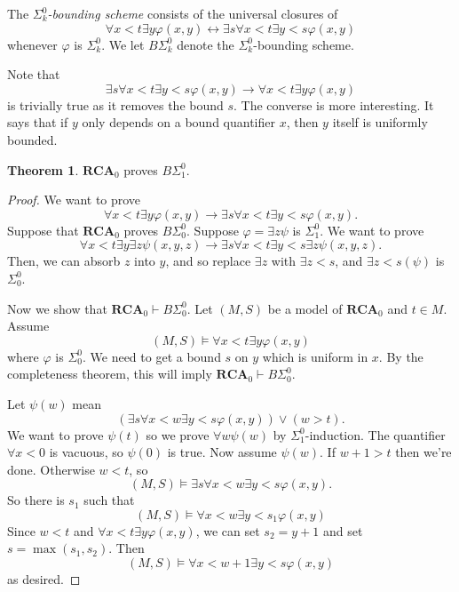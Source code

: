 \documentclass[12pt]{book}
\newcommand{\RCA}{\mathbf{RCA}}
\newcommand{\dfn}[1]{\emph{#1}\index{#1}}
\theoremstyle{definition}
\newtheorem{theorem}{Theorem}[chapter]
\newenvironment{definition}
  {\pushQED{\qed}\renewcommand{\qedsymbol}{$\diamondsuit$}\definitionx}
  {\popQED\endexamplex}
\begin{document}
\begin{definition}
The \dfn{$\Sigma_k^0$-bounding scheme} consists of the universal closures of
$$\forall x < t \exists y \varphi(x, y) \leftrightarrow \exists s \forall x < t \exists y < s \varphi(x, y)$$
whenever $\varphi$ is $\Sigma_k^0$. We let $B\Sigma_k^0$ denote the $\Sigma_k^0$-bounding scheme.
\end{definition}

Note that
$$\exists s \forall x < t \exists y < s \varphi(x, y) \to \forall x < t \exists y \varphi(x, y)$$
is trivially true as it removes the bound $s$. The converse is more interesting.
It says that if $y$ only depends on a bound quantifier $x$, then $y$ itself is uniformly bounded.

\begin{theorem}
$\RCA_0$ proves $B\Sigma_1^0$.
\end{theorem}
\begin{proof}
We want to prove
$$\forall x < t \exists y \varphi(x, y) \to \exists s \forall x < t \exists y < s \varphi(x, y).$$
Suppose that $\RCA_0$ proves $B\Sigma_0^0$.
Suppose $\varphi = \exists z \psi$ is $\Sigma_1^0$.
We want to prove
$$\forall x < t \exists y \exists z \psi(x, y, z) \to \exists s \forall x < t \exists y < s \exists z \psi(x, y, z).$$
Then, we can absorb $z$ into $y$, and so replace $\exists z$ with $\exists z < s$, and $\exists z < s(\psi)$ is $\Sigma_0^0$.

Now we show that $\RCA_0 \vdash B\Sigma_0^0$.
Let $(M, S)$ be a model of $\RCA_0$ and $t \in M$.
Assume
$$(M, S) \models \forall x < t \exists y \varphi(x, y)$$
where $\varphi$ is $\Sigma_0^0$.
We need to get a bound $s$ on $y$ which is uniform in $x$.
By the completeness theorem, this will imply $\RCA_0 \vdash B\Sigma_0^0$.

Let $\psi(w)$ mean
$$(\exists s \forall x < w \exists y < s \varphi(x, y)) \vee (w > t).$$
We want to prove $\psi(t)$ so we prove $\forall w\psi(w)$ by $\Sigma_1^0$-induction.
The quantifier $\forall x < 0$ is vacuous, so $\psi(0)$ is true.
Now assume $\psi(w)$.
If $w + 1 > t$ then we're done. Otherwise $w < t$, so
$$(M, S) \models \exists s \forall x < w \exists y < s \varphi(x, y).$$
So there is $s_1$ such that
$$(M, S) \models \forall x < w \exists y < s_1 \varphi(x, y)$$
Since $w < t$ and $\forall x < t \exists y \varphi(x, y)$, we can set $s_2 = y + 1$ and set $s = \max(s_1, s_2)$.
Then
$$(M, S) \models \forall x < w + 1 \exists y < s \varphi(x, y)$$
as desired.
\end{proof}
\end{document}
